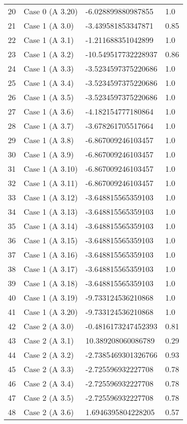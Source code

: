 \begin{tabularx}{\textwidth}{lXXX}
20 & Case 0 (A 3.20) & -6.028899880987855 & 1.0 \\
21 & Case 1 (A 3.0) & -3.439581853347871 & 0.85 \\
22 & Case 1 (A 3.1) & -1.211688351042899 & 1.0 \\
23 & Case 1 (A 3.2) & -10.549517732228937 & 0.86 \\
24 & Case 1 (A 3.3) & -3.5234597375220686 & 1.0 \\
25 & Case 1 (A 3.4) & -3.5234597375220686 & 1.0 \\
26 & Case 1 (A 3.5) & -3.5234597375220686 & 1.0 \\
27 & Case 1 (A 3.6) & -4.182154777180864 & 1.0 \\
28 & Case 1 (A 3.7) & -3.678261705517664 & 1.0 \\
29 & Case 1 (A 3.8) & -6.867009246103457 & 1.0 \\
30 & Case 1 (A 3.9) & -6.867009246103457 & 1.0 \\
31 & Case 1 (A 3.10) & -6.867009246103457 & 1.0 \\
32 & Case 1 (A 3.11) & -6.867009246103457 & 1.0 \\
33 & Case 1 (A 3.12) & -3.648815565359103 & 1.0 \\
34 & Case 1 (A 3.13) & -3.648815565359103 & 1.0 \\
35 & Case 1 (A 3.14) & -3.648815565359103 & 1.0 \\
36 & Case 1 (A 3.15) & -3.648815565359103 & 1.0 \\
37 & Case 1 (A 3.16) & -3.648815565359103 & 1.0 \\
38 & Case 1 (A 3.17) & -3.648815565359103 & 1.0 \\
39 & Case 1 (A 3.18) & -3.648815565359103 & 1.0 \\
40 & Case 1 (A 3.19) & -9.733124536210868 & 1.0 \\
41 & Case 1 (A 3.20) & -9.733124536210868 & 1.0 \\
42 & Case 2 (A 3.0) & -0.4816173247452393 & 0.81 \\
43 & Case 2 (A 3.1) & 10.389208060086789 & 0.29 \\
44 & Case 2 (A 3.2) & -2.7385469301326766 & 0.93 \\
45 & Case 2 (A 3.3) & -2.725596932227708 & 0.78 \\
46 & Case 2 (A 3.4) & -2.725596932227708 & 0.78 \\
47 & Case 2 (A 3.5) & -2.725596932227708 & 0.78 \\
48 & Case 2 (A 3.6) & 1.6946395804228205 & 0.57 \\

\end{tabularx}
